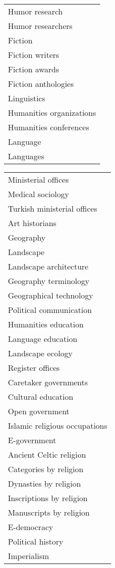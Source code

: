 \begin{table*}[h]
\begin{minipage}{0.48\textwidth}
\begin{tabular}{|l|}
Humor research \\
Humor researchers \\
Fiction \\
Fiction writers \\
Fiction awards \\
Fiction anthologies \\
Linguistics \\
Humanities organizations \\
Humanities conferences \\
Language \\
Languages \\
\hline
\end{tabular}
\end{minipage}
\hfill %
\begin{minipage}{0.48\textwidth}
\centering
\begin{tabular}{|l|}
\hline
Ministerial offices \\
Medical sociology \\
Turkish ministerial offices \\
Art historians \\
Geography \\
Landscape \\
Landscape architecture \\
Geography terminology \\
Geographical technology \\
Political communication \\
Humanities education \\
Language education \\
Landscape ecology \\
Register offices \\
Caretaker governments \\
Cultural education \\
Open government \\
Islamic religious occupations \\
E-government \\
Ancient Celtic religion \\
Categories by religion \\
Dynasties by religion \\
Inscriptions by religion \\
Manuscripts by religion \\
E-democracy \\
Political history \\
Imperialism \\

\end{tabular}
\end{minipage}
\end{table*}
